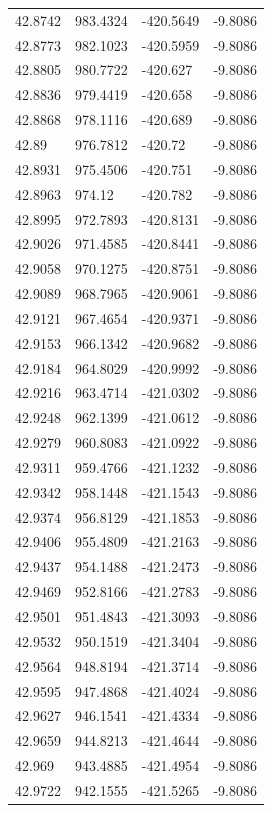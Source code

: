 \begin{table}[H]
\begin{tabular}{llll}
42.8742 & 983.4324 & -420.5649 & -9.8086 \\
42.8773 & 982.1023 & -420.5959 & -9.8086 \\
42.8805 & 980.7722 & -420.627 & -9.8086 \\
42.8836 & 979.4419 & -420.658 & -9.8086 \\
42.8868 & 978.1116 & -420.689 & -9.8086 \\
42.89 & 976.7812 & -420.72 & -9.8086 \\
42.8931 & 975.4506 & -420.751 & -9.8086 \\
42.8963 & 974.12 & -420.782 & -9.8086 \\
42.8995 & 972.7893 & -420.8131 & -9.8086 \\
42.9026 & 971.4585 & -420.8441 & -9.8086 \\
42.9058 & 970.1275 & -420.8751 & -9.8086 \\
42.9089 & 968.7965 & -420.9061 & -9.8086 \\
42.9121 & 967.4654 & -420.9371 & -9.8086 \\
42.9153 & 966.1342 & -420.9682 & -9.8086 \\
42.9184 & 964.8029 & -420.9992 & -9.8086 \\
42.9216 & 963.4714 & -421.0302 & -9.8086 \\
42.9248 & 962.1399 & -421.0612 & -9.8086 \\
42.9279 & 960.8083 & -421.0922 & -9.8086 \\
42.9311 & 959.4766 & -421.1232 & -9.8086 \\
42.9342 & 958.1448 & -421.1543 & -9.8086 \\
42.9374 & 956.8129 & -421.1853 & -9.8086 \\
42.9406 & 955.4809 & -421.2163 & -9.8086 \\
42.9437 & 954.1488 & -421.2473 & -9.8086 \\
42.9469 & 952.8166 & -421.2783 & -9.8086 \\
42.9501 & 951.4843 & -421.3093 & -9.8086 \\
42.9532 & 950.1519 & -421.3404 & -9.8086 \\
42.9564 & 948.8194 & -421.3714 & -9.8086 \\
42.9595 & 947.4868 & -421.4024 & -9.8086 \\
42.9627 & 946.1541 & -421.4334 & -9.8086 \\
42.9659 & 944.8213 & -421.4644 & -9.8086 \\
42.969 & 943.4885 & -421.4954 & -9.8086 \\
42.9722 & 942.1555 & -421.5265 & -9.8086 \\

\end{tabular}
\end{table}
